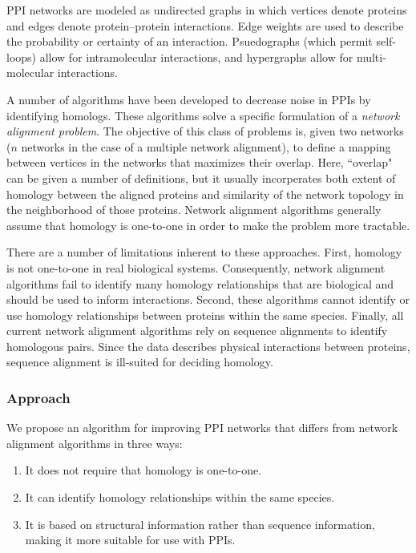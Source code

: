 \documentclass[12pt,twoside]{article}
\newenvironment{denseenum}{
\begin{enumerate}
  \setlength{\itemsep}{0.1em}
  \setlength{\parskip}{0em}
  \setlength{\parsep}{0em}
}{\end{enumerate}}
\begin{document}
PPI networks are modeled as undirected graphs in which vertices denote proteins and edges denote protein--protein interactions. Edge weights are used to describe the probability or certainty of an interaction. Psuedographs (which permit self-loops) allow for intramolecular interactions, and hypergraphs allow for multi-molecular interactions.

A number of algorithms have been developed to decrease noise in PPIs by identifying homologs. These algorithms solve a specific formulation of a \emph{network alignment problem}. The objective of this class of problems is, given two networks ($n$ networks in the case of a multiple network alignment), to define a mapping between vertices in the networks that maximizes their overlap. Here, ``overlap" can be given a number of definitions, but it usually incorperates both extent of homology between the aligned proteins and similarity of the network topology in the neighborhood of those proteins. Network alignment algorithms generally assume that homology is one-to-one in order to make the problem more tractable.

There are a number of limitations inherent to these approaches. First, homology is not one-to-one in real biological systems. Consequently, network alignment algorithms fail to identify many homology relationships that are biological and should be used to inform interactions. Second, these algorithms cannot identify or use homology relationships between proteins within the same species. Finally, all current network alignment algorithms rely on sequence alignments to identify homologous pairs. Since the data describes physical interactions between proteins, sequence alignment is ill-suited for deciding homology.

\subsubsection{Approach}
We propose an algorithm for improving PPI networks that differs from network alignment algorithms in three ways:

\begin{denseenum}
\item It does not require that homology is one-to-one.
\item It can identify homology relationships within the same species.
\item It is based on structural information rather than sequence information, making it more suitable for use with PPIs.
\end{denseenum}
\end{document}
